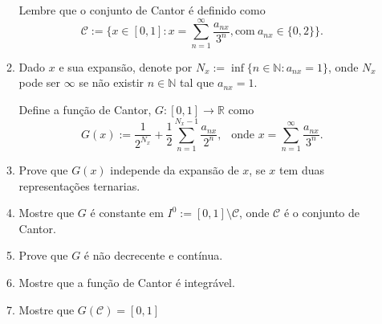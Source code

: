 \documentclass{article}
\theoremstyle{plain}
\theoremstyle{definition}
\theoremstyle{remark}
\newcommand{\R}{{\mathbb R}}
\begin{document}
\begin{enumerate}
\begin{enumerate}
   Lembre que o conjunto de Cantor é definido como 
   $$\mathcal{C}:=\{ x \in [0,1]: x=\sum_{n=1}^{\infty} \frac{a_{nx}}{3^{n}}, \text{com} \ a_{nx} \in \{0,2\}\}.$$ 
   \item Dado $x$ e sua expansão, denote por 
   $N_{x}:=\inf \{n \in \mathbb{N}: a_{nx}=1\}$, onde $N_{x}$ 
   pode ser $\infty$ 
   se não existir $n \in \mathbb{N}$ tal que $a_{nx}=1$.

   Define a função de Cantor, $G:[0,1]\rightarrow \R$ como 
   $$ G(x):= \frac{1}{2^{N_x}}+ \frac{1}{2} \sum_{n=1}^{N_x-1}\frac{a_{nx}}{2^{n}}, \ \ \text{ onde } x= \sum_{n=1}^{\infty} \frac{a_{nx}}{3^{n}}.$$
   \item Prove que $G(x)$ independe da expansão de $x$, se 
   $x$ tem duas representações ternarias. 
   \item Mostre que $G$ é constante em $I^{0}:=[0,1] \setminus \mathcal{C}$, 
   onde $\mathcal{C}$ é o conjunto de Cantor.
   \item Prove que $G$ é não decrecente e contínua.
   \item Mostre que a função de Cantor é integrável.
   \item Mostre que $G(\mathcal{C})=[0,1]$ 
\end{enumerate}    


\end{enumerate}
\end{document}
